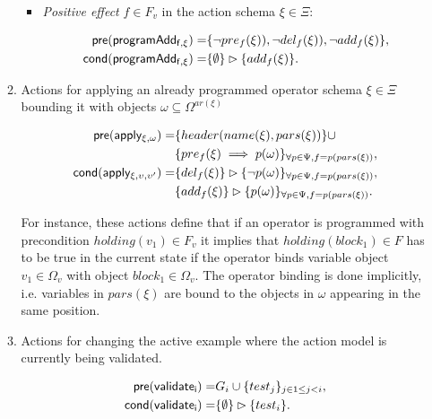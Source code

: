 \documentclass[letterpaper]{article} %
\newcommand{\pre}{\mathsf{pre}}     %
\newcommand{\cond}{\mathsf{cond}}   %
\begin{document}
\begin{itemize}
\begin{enumerate}
\begin{itemize}
\item {\em Positive effect} $f\in F_v$ in the action schema $\xi\in\Xi$:
\begin{small}
\begin{align*}
\hspace*{7pt}\pre(\mathsf{programAdd_{f,\xi}})=&\{\neg pre_{f}(\xi)),\neg del_{f}(\xi)),\neg add_{f}(\xi)\},\\                                                   
\cond(\mathsf{programAdd_{f,\xi}})=&\{\emptyset\}\rhd\{add_{f}(\xi)\}.
\end{align*}
\end{small}
\end{itemize}

\item Actions for applying an already programmed operator schema $\xi\in\Xi$ bounding it with objects $\omega\subseteq\Omega^{ar(\xi)}$
\begin{small}
\begin{align*}
\hspace*{7pt}\pre(\mathsf{apply_{\xi,\omega}})=&\{header(name(\xi),pars(\xi))\}\cup\\     
                                           &\{pre_{f}(\xi)\implies p(\omega)\}_{\forall p\in\Psi,f=p(pars(\xi))},\\
\cond(\mathsf{apply_{\xi,\upsilon,\upsilon'}})=&\{del_{f}(\xi)\}\rhd\{\neg p(\omega)\}_{\forall p\in\Psi,f=p(pars(\xi))},\\
&\{add_{f}(\xi)\}\rhd\{p(\omega)\}_{\forall p\in\Psi,f=p(pars(\xi))}.
\end{align*}
\end{small}

For instance, these actions define that if an operator is programmed with precondition $holding(v_1)\in F_v$ it implies that $holding(block_1)\in F$ has to be true in the current state if the operator binds variable object $v_1\in\Omega_v$ with object $block_1\in\Omega_v$. The operator binding is done implicitly, i.e. variables in $pars(\xi)$ are bound to the objects in $\omega$ appearing in the same position. 

\item Actions for changing the active example where the action model is currently being validated.
\begin{small}
\begin{align*}
\hspace*{7pt}\pre(\mathsf{validate_{i}})=&G_i\cup\{test_j\}_{j\in 1\leq j<i},\\
\cond(\mathsf{validate_{i}})=&\{\emptyset\}\rhd\{test_i\}.
\end{align*}
\end{small}
\end{enumerate}
\end{itemize}
\end{document}
